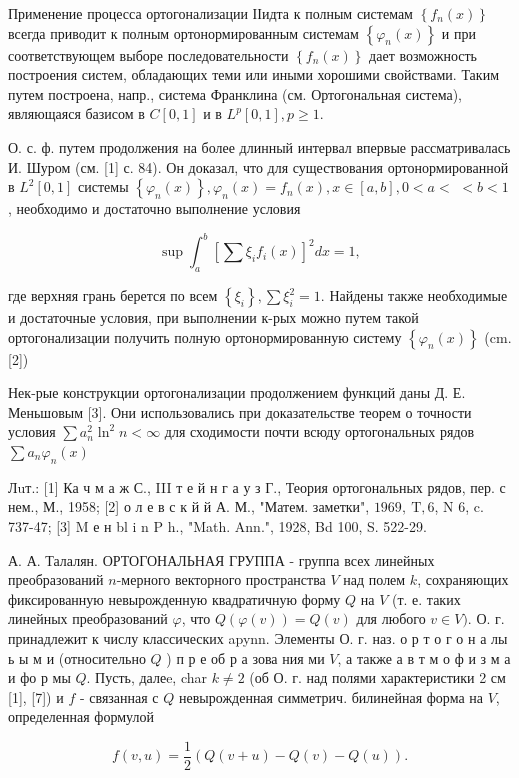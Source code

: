 \documentclass[10pt]{article}
\begin{document}
Применение процесса ортогонализации ІІидта к полным системам $\left\{f_{n}(x)\right\}$ всегда приводит к полным ортонормированным системам $\left\{\varphi_{n}(x)\right\}$ и при соответствующем выборе последовательности $\left\{f_{n}(x)\right\}$ дает возможность построения систем, обладающих теми или иными хорошими свойствами. Таким путем построена, напр., система Франклина (см. Ортогональная система), являющаяся базисом в $C[0,1]$ и в $L^{p}[0,1], p \geqslant 1$.

О. с. ф. путем продолжения на более длинный интервал впервые рассматривалась И. Шуром (см. [1] с. 84). Он доказал, что для существования ортонормированной в $L^{2}[0,1]$ системы $\left\{\varphi_{n}(x)\right\}, \varphi_{n}(x)=f_{n}(x), x \in[a, b], 0<a<$ $<b<1$, необходимо и достаточно выполнение условия

\[
\sup \int_{a}^{b}\left[\sum \xi_{i} f_{i}(x)\right]^{2} d x=1,
\]

где верхняя грань берется по всем $\left\{\xi_{i}\right\}, \sum \xi_{i}^{2}=1$. Найдены также необходимые и достаточные условия, при выполнении к-рых можно путем такой ортогонализации получить полную ортонормированную систему $\left\{\varphi_{n}(x)\right\}$ (cm. [2])

Нек-рые конструкции ортогонализации продолжением функций даны Д. Е. Меньшовым [3]. Они использовались при доказательстве теорем о точности условия $\sum a_{n}^{2} \ln ^{2} n<\infty$ для сходимости почти всюду ортогональных рядов $\sum a_{n} \varphi_{n}(x)$

Лuт.: [1] Ка ч м а ж С., III т е й н г а у з Г., Теория ортогональных рядов, пер. с нем., М., 1958; [2] о л е в с к й й А. М., "Матем. заметки", $1969, \mathrm{~T}, 6$, N 6, c. 737-47; [3] M е н bl i n P h., "Math. Ann.", 1928, Bd 100, S. 522-29.

А. А. Талалян. ОРТОГОНАЛЬНАЯ ГРУППА - группа всех линейных преобразований $n$-мерного векторного пространства $V$ над полем $k$, сохраняющих фиксированную невырожденную квадратичную форму $Q$ на $V$ (т. е. таких линейных преобразований $\varphi$, что $Q(\varphi(v))=Q(v)$ для любого $v \in V)$. О. г. принадлежит к числу классических apynn. Элементы О. г. наз. о р т о г о н а лы ь ы м и (относительно $Q$ ) п р е об р а зова ния ми $V$, а также а в т м о ф и з м а и фо р мы $Q$. Пусть, далеe, char $k \neq 2$ (об О. г. над полями характеристики 2 см [1], [7]) и $f$ - связанная с $Q$ невырожденная симметрич. билинейная форма на $V$, определенная формулой

\[
f(v, u)=\frac{1}{2}(Q(v+u)-Q(v)-Q(u)) .
\]
\end{document}
